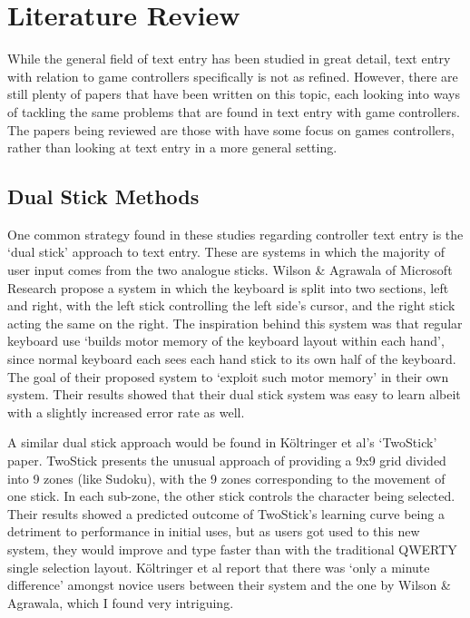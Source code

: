 \documentclass[requirements.tex]{subfiles}
\begin{document}
\section{Literature Review} %
\label{sec:literature_review}

While the general field of text entry has been studied in great detail, text
entry with relation to game controllers specifically is not as refined. However,
there are still plenty of papers that have been written on this topic, each
looking into ways of tackling the same problems that are found in text entry
with game controllers. The papers being reviewed are those with have some focus
on games controllers, rather than looking at text entry in a more general
setting.

\subsection{Dual Stick Methods} %
\label{sub:dual_stick_methods}
One common strategy found in these studies regarding controller text entry is
the `dual stick' approach to text entry. These are systems in which the majority
of user input comes from the two analogue sticks. Wilson \& Agrawala
\cite{Wilson:2006:TEU:1124772.1124844} of Microsoft Research propose a system
in which the keyboard is split into two sections, left and right, with the
left stick controlling the left side's cursor, and the right stick acting the
same on the right. The inspiration behind this system was that regular keyboard
use `builds motor memory of the keyboard layout within each hand', since normal
keyboard each sees each hand stick to its own half of the keyboard. The goal of
their proposed system to `exploit such motor memory' in their own system. Their
results showed that their dual stick system was easy to learn albeit with a
slightly increased error rate as well. 

A similar dual stick approach would be found in K\"{o}ltringer et al's
\cite{Koltringer:2007:TWG:1268517.1268536} `TwoStick' paper. TwoStick presents
the unusual approach of providing a 9x9 grid divided into 9 zones (like Sudoku),
with the 9 zones corresponding to the movement of one stick. In each sub-zone,
the other stick controls the character being selected. Their results showed a
predicted outcome of TwoStick's learning curve being a detriment to performance
in initial uses, but as users got used to this new system, they would improve
and type faster than with the traditional QWERTY single selection layout. 
K\"{o}ltringer et al report that there was `only a minute difference' amongst
novice users between their system and the one by Wilson \& Agrawala, which I
found very intriguing.
\end{document}
